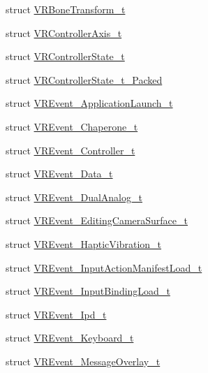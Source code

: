\begin{DoxyCompactItemize}
\item 
struct \mbox{\hyperlink{struct_valve_1_1_v_r_1_1_v_r_bone_transform__t}{V\+R\+Bone\+Transform\+\_\+t}}
\item 
struct \mbox{\hyperlink{struct_valve_1_1_v_r_1_1_v_r_controller_axis__t}{V\+R\+Controller\+Axis\+\_\+t}}
\item 
struct \mbox{\hyperlink{struct_valve_1_1_v_r_1_1_v_r_controller_state__t}{V\+R\+Controller\+State\+\_\+t}}
\item 
struct \mbox{\hyperlink{struct_valve_1_1_v_r_1_1_v_r_controller_state__t___packed}{V\+R\+Controller\+State\+\_\+t\+\_\+\+Packed}}
\item 
struct \mbox{\hyperlink{struct_valve_1_1_v_r_1_1_v_r_event___application_launch__t}{V\+R\+Event\+\_\+\+Application\+Launch\+\_\+t}}
\item 
struct \mbox{\hyperlink{struct_valve_1_1_v_r_1_1_v_r_event___chaperone__t}{V\+R\+Event\+\_\+\+Chaperone\+\_\+t}}
\item 
struct \mbox{\hyperlink{struct_valve_1_1_v_r_1_1_v_r_event___controller__t}{V\+R\+Event\+\_\+\+Controller\+\_\+t}}
\item 
struct \mbox{\hyperlink{struct_valve_1_1_v_r_1_1_v_r_event___data__t}{V\+R\+Event\+\_\+\+Data\+\_\+t}}
\item 
struct \mbox{\hyperlink{struct_valve_1_1_v_r_1_1_v_r_event___dual_analog__t}{V\+R\+Event\+\_\+\+Dual\+Analog\+\_\+t}}
\item 
struct \mbox{\hyperlink{struct_valve_1_1_v_r_1_1_v_r_event___editing_camera_surface__t}{V\+R\+Event\+\_\+\+Editing\+Camera\+Surface\+\_\+t}}
\item 
struct \mbox{\hyperlink{struct_valve_1_1_v_r_1_1_v_r_event___haptic_vibration__t}{V\+R\+Event\+\_\+\+Haptic\+Vibration\+\_\+t}}
\item 
struct \mbox{\hyperlink{struct_valve_1_1_v_r_1_1_v_r_event___input_action_manifest_load__t}{V\+R\+Event\+\_\+\+Input\+Action\+Manifest\+Load\+\_\+t}}
\item 
struct \mbox{\hyperlink{struct_valve_1_1_v_r_1_1_v_r_event___input_binding_load__t}{V\+R\+Event\+\_\+\+Input\+Binding\+Load\+\_\+t}}
\item 
struct \mbox{\hyperlink{struct_valve_1_1_v_r_1_1_v_r_event___ipd__t}{V\+R\+Event\+\_\+\+Ipd\+\_\+t}}
\item 
struct \mbox{\hyperlink{struct_valve_1_1_v_r_1_1_v_r_event___keyboard__t}{V\+R\+Event\+\_\+\+Keyboard\+\_\+t}}
\item 
struct \mbox{\hyperlink{struct_valve_1_1_v_r_1_1_v_r_event___message_overlay__t}{V\+R\+Event\+\_\+\+Message\+Overlay\+\_\+t}}

\end{DoxyCompactItemize}
